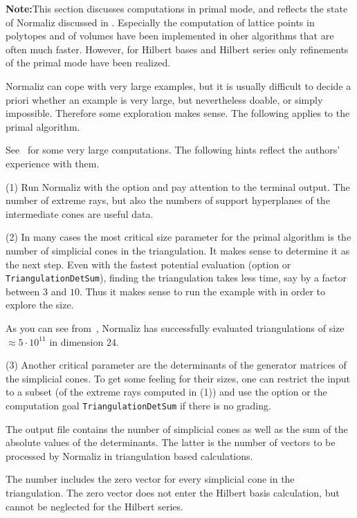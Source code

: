 \textbf{Note:}\enspace This section discusses computations in primal mode, and reflects the state of Normaliz discussed in \cite{BIS}. Especially the computation of lattice points in polytopes and of volumes have been implemented in oher algorithms that are often much faster. However, for Hilbert bases and Hilbert series only refinements of the primal mode have been realized.\bigskip

Normaliz can cope with very large examples, but it
is usually difficult to decide a priori whether an example is
very large, but nevertheless doable, or simply impossible.
Therefore some exploration makes sense. The following applies to the primal algorithm.

See~\cite{BIS} for some very large computations. The following
hints reflect the authors' experience with them.

(1) Run Normaliz with the option  and pay attention
to the terminal output. The number of extreme rays, but also
the numbers of support hyperplanes of the intermediate cones
are useful data.

(2) In many cases the most critical size parameter for the primal algorithm is the
number of simplicial cones in the triangulation. It makes sense
to determine it as the next step. Even with the fastest
potential evaluation (option  or \verb|TriangulationDetSum|), finding the
triangulation takes less time, say by a factor between $3$ and
$10$. Thus it makes sense to run the example with  in
order to explore the size.

As you can see from~\cite{BIS}, Normaliz has successfully
evaluated triangulations of size $\approx 5\cdot 10^{11}$ in
dimension $24$.

(3) Another critical parameter are the determinants of the
generator matrices of the simplicial cones. To get some feeling
for their sizes, one can restrict the input to a subset (of the
extreme rays computed in (1)) and use the option  or the computation goal \verb|TriangulationDetSum| if there is no grading.

The output file contains the number of simplicial cones as well
as the sum of the absolute values of the determinants. The
latter is the number of vectors to be processed by Normaliz
in triangulation based calculations.

The number includes the zero vector for every simplicial cone
in the triangulation. The zero vector does not enter the
Hilbert basis calculation, but cannot be neglected for the
Hilbert series.

